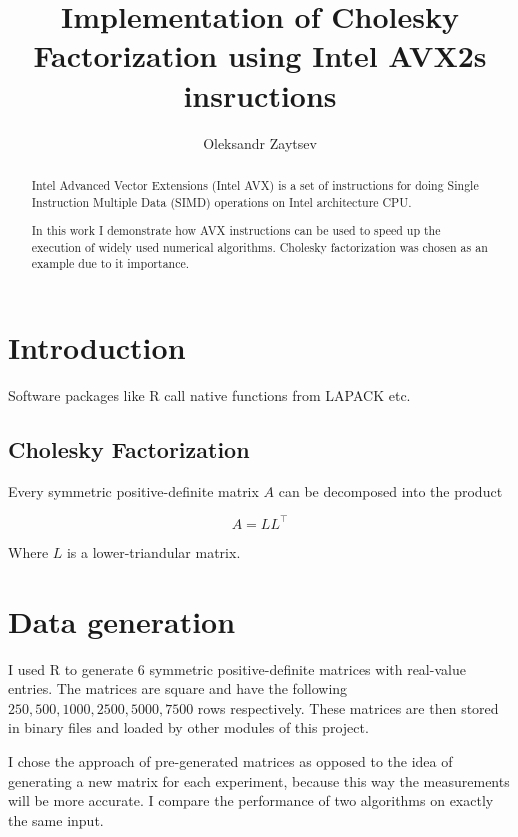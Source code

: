 \documentclass[sigplan]{acmart}
\begin{document}
\title{Implementation of Cholesky Factorization using Intel AVX2s insructions}

\author{Oleksandr Zaytsev}

\begin{abstract}
Intel Advanced Vector Extensions (Intel AVX) is a set of instructions for doing Single Instruction Multiple Data (SIMD) operations on Intel architecture CPU\cite{lomont-11}.

In this work I demonstrate how AVX instructions can be used to speed up the execution of widely used numerical algorithms. Cholesky factorization was chosen as an example due to it importance.
\end{abstract}


\maketitle

\section{Introduction}
Software packages like R call native functions from LAPACK etc.

\subsection{Cholesky Factorization}
Every symmetric positive-definite matrix $A$ can be decomposed into the product

\[ A = LL^\top \]

Where $L$ is a lower-triandular matrix.

\section{Data generation}
I used R to generate 6 symmetric positive-definite matrices with real-value entries. The matrices are square and have the following $250, 500, 1000, 2500, 5000, 7500$ rows respectively. These matrices are then stored in binary files and loaded by other modules of this project.

I chose the approach of pre-generated matrices as opposed to the idea of generating a new matrix for each experiment, because this way the measurements will be more accurate. I compare the performance of two algorithms on exactly the same input.
\end{document}
